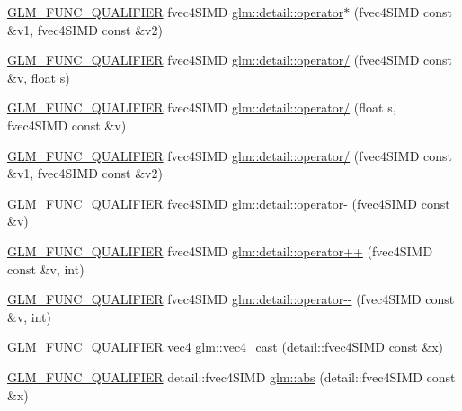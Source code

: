 \begin{DoxyCompactItemize}
\item 
\hyperlink{setup_8hpp_a33fdea6f91c5f834105f7415e2a64407}{G\+L\+M\+\_\+\+F\+U\+N\+C\+\_\+\+Q\+U\+A\+L\+I\+F\+I\+ER} fvec4\+S\+I\+MD \hyperlink{namespaceglm_1_1detail_ae683c4041ea23fddf34c36b87cbbd319}{glm\+::detail\+::operator$\ast$} (fvec4\+S\+I\+MD const \&v1, fvec4\+S\+I\+MD const \&v2)
\item 
\hyperlink{setup_8hpp_a33fdea6f91c5f834105f7415e2a64407}{G\+L\+M\+\_\+\+F\+U\+N\+C\+\_\+\+Q\+U\+A\+L\+I\+F\+I\+ER} fvec4\+S\+I\+MD \hyperlink{namespaceglm_1_1detail_af8a63b3b0eb2a7c3f59120bb4e160a76}{glm\+::detail\+::operator/} (fvec4\+S\+I\+MD const \&v, float s)
\item 
\hyperlink{setup_8hpp_a33fdea6f91c5f834105f7415e2a64407}{G\+L\+M\+\_\+\+F\+U\+N\+C\+\_\+\+Q\+U\+A\+L\+I\+F\+I\+ER} fvec4\+S\+I\+MD \hyperlink{namespaceglm_1_1detail_ac19446d5d6cc38cac352c5c6b802ab81}{glm\+::detail\+::operator/} (float s, fvec4\+S\+I\+MD const \&v)
\item 
\hyperlink{setup_8hpp_a33fdea6f91c5f834105f7415e2a64407}{G\+L\+M\+\_\+\+F\+U\+N\+C\+\_\+\+Q\+U\+A\+L\+I\+F\+I\+ER} fvec4\+S\+I\+MD \hyperlink{namespaceglm_1_1detail_aefac49f641fdbfa4140c9465cf30a625}{glm\+::detail\+::operator/} (fvec4\+S\+I\+MD const \&v1, fvec4\+S\+I\+MD const \&v2)
\item 
\hyperlink{setup_8hpp_a33fdea6f91c5f834105f7415e2a64407}{G\+L\+M\+\_\+\+F\+U\+N\+C\+\_\+\+Q\+U\+A\+L\+I\+F\+I\+ER} fvec4\+S\+I\+MD \hyperlink{namespaceglm_1_1detail_a0fd34f78cac49e112724c4fc71a4837c}{glm\+::detail\+::operator-\/} (fvec4\+S\+I\+MD const \&v)
\item 
\hyperlink{setup_8hpp_a33fdea6f91c5f834105f7415e2a64407}{G\+L\+M\+\_\+\+F\+U\+N\+C\+\_\+\+Q\+U\+A\+L\+I\+F\+I\+ER} fvec4\+S\+I\+MD \hyperlink{namespaceglm_1_1detail_a2434183491dc1c79ecd2860e789978f5}{glm\+::detail\+::operator++} (fvec4\+S\+I\+MD const \&v, int)
\item 
\hyperlink{setup_8hpp_a33fdea6f91c5f834105f7415e2a64407}{G\+L\+M\+\_\+\+F\+U\+N\+C\+\_\+\+Q\+U\+A\+L\+I\+F\+I\+ER} fvec4\+S\+I\+MD \hyperlink{namespaceglm_1_1detail_aa03040a975ab9847d84e843caa13ec86}{glm\+::detail\+::operator-\/-\/} (fvec4\+S\+I\+MD const \&v, int)
\item 
\hyperlink{setup_8hpp_a33fdea6f91c5f834105f7415e2a64407}{G\+L\+M\+\_\+\+F\+U\+N\+C\+\_\+\+Q\+U\+A\+L\+I\+F\+I\+ER} vec4 \hyperlink{namespaceglm_a8fd3f484b1badc1724ab65dc9714ad6c}{glm\+::vec4\+\_\+cast} (detail\+::fvec4\+S\+I\+MD const \&x)
\item 
\hyperlink{setup_8hpp_a33fdea6f91c5f834105f7415e2a64407}{G\+L\+M\+\_\+\+F\+U\+N\+C\+\_\+\+Q\+U\+A\+L\+I\+F\+I\+ER} detail\+::fvec4\+S\+I\+MD \hyperlink{namespaceglm_a68109cc8f5b3e44fd65707fac87fb4d5}{glm\+::abs} (detail\+::fvec4\+S\+I\+MD const \&x)

\end{DoxyCompactItemize}
